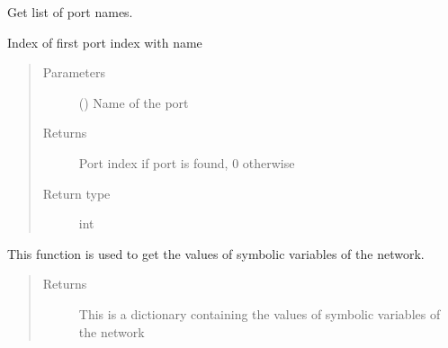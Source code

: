\documentclass[letterpaper,10pt,english]{sphinxmanual}
\begin{document}
\begin{fulllineitems}
\begin{fulllineitems}
\label{\detokenize{touchstone:touchstone.spfile.get_no_of_ports}}
\end{fulllineitems}


\begin{fulllineitems}
\label{\detokenize{touchstone:touchstone.spfile.get_port_names}}
Get list of port names.

\end{fulllineitems}


\begin{fulllineitems}
\label{\detokenize{touchstone:touchstone.spfile.get_port_number_from_name}}
Index of first port index with name 
\begin{quote}\begin{description}
\item[{Parameters}] \leavevmode
{} () \textendash{} Name of the port

\item[{Returns}] \leavevmode
Port index if port is found, 0 otherwise

\item[{Return type}] \leavevmode
int

\end{description}\end{quote}

\end{fulllineitems}


\begin{fulllineitems}
\label{\detokenize{touchstone:touchstone.spfile.get_sym_parameters}}
This function is used to get the values of symbolic variables of the network.
\begin{quote}\begin{description}
\item[{Returns}] \leavevmode
This is a dictionary containing the values of symbolic variables of the network


\end{description}
\end{quote}
\end{fulllineitems}
\end{fulllineitems}
\end{document}
